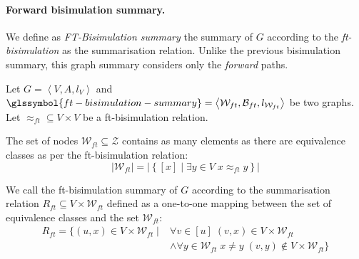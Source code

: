 \paragraph{Forward bisimulation summary.}

We define as \emph{FT-Bisimulation summary}  the summary of $G$ according to the \emph{ft-bisimulation} as the summarisation relation. Unlike the previous bisimulation summary, this graph summary considers only the \emph{forward} paths.

\begin{definition}
Let $G=\left\langle V, A, l_V \right\rangle$ and $\glssymbol{ft-bisimulation-summary} = \left\langle \mathcal{W}_{ft}, \mathcal{B}_{ft}, l_{\mathcal{W}_{ft}} \right\rangle$ be two graphs. Let $\approx_{ft} \subseteq V \times V$ be a ft-bisimulation relation.

The set of nodes $\mathcal{W}_{ft} \subseteq \mathcal{Z}$ contains as many elements as there are equivalence classes as per the ft-bisimulation relation:
$$
\lvert \mathcal{W}_{ft} \rvert = \lvert \left\lbrace [x] \mid \exists y \in V\; x \approx_{ft} y \right\rbrace \rvert
$$

We call  the ft-bisimulation summary of $G$ according to the summarisation relation $R_{ft} \subseteq V \times \mathcal{W}_{ft}$ defined as a one-to-one mapping between the set of equivalence classes and the set $\mathcal{W}_{ft}$:
$$
\begin{aligned}
R_{ft} = \{ \left( u, x \right) \in V \times \mathcal{W}_{ft} \mid & \forall v \in [u]\; \left( v, x \right) \in V \times \mathcal{W}_{ft} \\
& \wedge \forall y \in \mathcal{W}_{ft}\; x \neq y\; (v, y) \not \in V \times \mathcal{W}_{ft} \}
\end{aligned}
$$
\end{definition}

